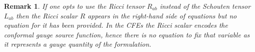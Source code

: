 \documentclass[10pt,a4paper]{article}
\theoremstyle{plain}
\newtheorem{remark}{Remark}
\begin{document}


 \begin{remark}
   \emph{ If one opts to use the Ricci tensor $R_{ab}$ instead of the
     Schouten tensor $L_{ab}$ then the Ricci scalar $R$ appears in the
     right-hand side of equations but no equation for it has been
     provided.  In the CFEs the Ricci scalar encodes the
     \emph{conformal gauge source function}, hence there is no
     equation to fix that variable as it represents a gauge quantity
     of the formulation.}
 \end{remark}
\end{document}

